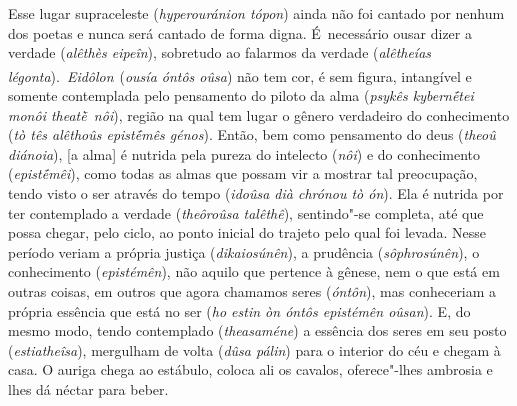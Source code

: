 Esse lugar supraceleste (\emph{hyperouránion tópon}) ainda não foi
cantado por nenhum dos poetas e nunca será cantado de forma digna. É~necessário ousar dizer a verdade (\emph{alêthès eipeîn}), sobretudo ao
falarmos da verdade (\emph{alêtheías
légonta}).~\emph{Eidôlon}\textsuperscript{~}(\emph{ousía óntôs oûsa})
não tem cor, é sem figura, intangível e somente contemplada pelo
pensamento do piloto da alma (\emph{psykês kybernḗtei monôi
theatḕ~nôi}), região na qual tem lugar o gênero verdadeiro do
conhecimento (\emph{tò tês alêthoûs epistḗmês génos}). \bekker{[247d]} Então,
bem como pensamento do deus (\emph{theoû diánoia}), [a alma] é
nutrida pela pureza do intelecto (\emph{nôi}) e do conhecimento
(\emph{epistḗmêi}), como todas as almas que possam vir a mostrar tal
preocupação, tendo visto o ser através do tempo (\emph{idoûsa dià
chrónou tò ón}). Ela é nutrida por ter contemplado a verdade
(\emph{theôroûsa talêthê}), sentindo"-se completa, até que possa chegar,
pelo ciclo, ao ponto inicial do trajeto pelo qual foi levada. Nesse
período veriam a própria justiça (\emph{dikaiosúnên}), a prudência
(\emph{sôphrosúnên}), o conhecimento (\emph{epistémên}), \bekker{[247e]} não
aquilo que pertence à gênese, nem o que está em outras coisas, em outros
que agora chamamos seres (\emph{óntôn}), mas conheceriam a própria
essência que está no ser (\emph{ho estin òn óntôs epistémên oûsan}). E,
do mesmo modo, tendo contemplado (\emph{theasaméne}) a essência dos
seres em seu posto (\emph{estiatheîsa}), mergulham de volta (\emph{dûsa
pálin}) para o interior do céu e chegam à casa. O
auriga chega ao estábulo, coloca ali os cavalos, oferece"-lhes ambrosia e
lhes dá néctar para beber.

